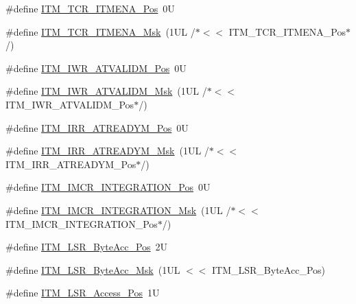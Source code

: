 \begin{DoxyCompactItemize}
\item 
\#define \hyperlink{group___c_m_s_i_s___i_t_m_ga3286b86004bce7ffe17ee269f87f8d9d}{I\+T\+M\+\_\+\+T\+C\+R\+\_\+\+I\+T\+M\+E\+N\+A\+\_\+\+Pos}~0U
\item 
\#define \hyperlink{group___c_m_s_i_s___i_t_m_ga7dd53e3bff24ac09d94e61cb595cb2d9}{I\+T\+M\+\_\+\+T\+C\+R\+\_\+\+I\+T\+M\+E\+N\+A\+\_\+\+Msk}~(1\+U\+L /$\ast$$<$$<$ I\+T\+M\+\_\+\+T\+C\+R\+\_\+\+I\+T\+M\+E\+N\+A\+\_\+\+Pos$\ast$/)
\item 
\#define \hyperlink{group___c_m_s_i_s___i_t_m_ga04d3f842ad48f6a9127b4cecc963e1d7}{I\+T\+M\+\_\+\+I\+W\+R\+\_\+\+A\+T\+V\+A\+L\+I\+D\+M\+\_\+\+Pos}~0U
\item 
\#define \hyperlink{group___c_m_s_i_s___i_t_m_ga67b969f8f04ed15886727788f0e2ffd7}{I\+T\+M\+\_\+\+I\+W\+R\+\_\+\+A\+T\+V\+A\+L\+I\+D\+M\+\_\+\+Msk}~(1\+U\+L /$\ast$$<$$<$ I\+T\+M\+\_\+\+I\+W\+R\+\_\+\+A\+T\+V\+A\+L\+I\+D\+M\+\_\+\+Pos$\ast$/)
\item 
\#define \hyperlink{group___c_m_s_i_s___i_t_m_ga259edfd1d2e877a62e06d7a240df97f4}{I\+T\+M\+\_\+\+I\+R\+R\+\_\+\+A\+T\+R\+E\+A\+D\+Y\+M\+\_\+\+Pos}~0U
\item 
\#define \hyperlink{group___c_m_s_i_s___i_t_m_ga3dbc3e15f5bde2669cd8121a1fe419b9}{I\+T\+M\+\_\+\+I\+R\+R\+\_\+\+A\+T\+R\+E\+A\+D\+Y\+M\+\_\+\+Msk}~(1\+U\+L /$\ast$$<$$<$ I\+T\+M\+\_\+\+I\+R\+R\+\_\+\+A\+T\+R\+E\+A\+D\+Y\+M\+\_\+\+Pos$\ast$/)
\item 
\#define \hyperlink{group___c_m_s_i_s___i_t_m_ga08de02bf32caf48aaa29f7c68ff5d755}{I\+T\+M\+\_\+\+I\+M\+C\+R\+\_\+\+I\+N\+T\+E\+G\+R\+A\+T\+I\+O\+N\+\_\+\+Pos}~0U
\item 
\#define \hyperlink{group___c_m_s_i_s___i_t_m_ga8838bd3dd04c1a6be97cd946364a3fd2}{I\+T\+M\+\_\+\+I\+M\+C\+R\+\_\+\+I\+N\+T\+E\+G\+R\+A\+T\+I\+O\+N\+\_\+\+Msk}~(1\+U\+L /$\ast$$<$$<$ I\+T\+M\+\_\+\+I\+M\+C\+R\+\_\+\+I\+N\+T\+E\+G\+R\+A\+T\+I\+O\+N\+\_\+\+Pos$\ast$/)
\item 
\#define \hyperlink{group___c_m_s_i_s___i_t_m_gabfae3e570edc8759597311ed6dfb478e}{I\+T\+M\+\_\+\+L\+S\+R\+\_\+\+Byte\+Acc\+\_\+\+Pos}~2U
\item 
\#define \hyperlink{group___c_m_s_i_s___i_t_m_ga91f492b2891bb8b7eac5b58de7b220f4}{I\+T\+M\+\_\+\+L\+S\+R\+\_\+\+Byte\+Acc\+\_\+\+Msk}~(1\+U\+L $<$$<$ I\+T\+M\+\_\+\+L\+S\+R\+\_\+\+Byte\+Acc\+\_\+\+Pos)
\item 
\#define \hyperlink{group___c_m_s_i_s___i_t_m_ga144a49e12b83ad9809fdd2769094fdc0}{I\+T\+M\+\_\+\+L\+S\+R\+\_\+\+Access\+\_\+\+Pos}~1U
\item 
$$
\end{DoxyCompactItemize}
